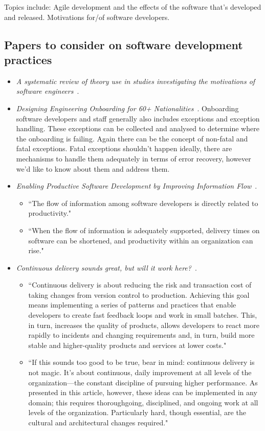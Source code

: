 Topics include: Agile development and the effects of the software that's developed and released. Motivations for/of software developers.

\subsection{Papers to consider on software development practices}
\begin{itemize}
    \item \emph{A systematic review of theory use in studies investigating the motivations of software engineers}~\citep{hall2009systematic}.
    \item \emph{Designing Engineering Onboarding for 60+ Nationalities}~\citep{harty2020_designing_engineering_onboarding}. Onboarding software developers and staff generally also includes exceptions and exception handling. These exceptions can be collected and analysed to determine where the onboarding is failing. Again there can be the concept of non-fatal and fatal exceptions. Fatal exceptions shouldn't happen ideally, there are mechanisms to handle them adequately in terms of error recovery, however we'd like to know about them and address them.
    \item \emph{Enabling Productive Software Development by Improving Information Flow}~\citep{murphy_enabling_2019}. 
    \begin{itemize}
        \item ``The flow of information among software developers is directly related to productivity."
        \item ``When the flow of information is adequately supported, delivery times on software can be shortened, and productivity within an organization can rise."
    \end{itemize}
    \item \emph{Continuous delivery sounds great, but will it work here?}~\citep{humble2018_continuous_delivery_sounds_great}. 
    \begin{itemize}
        \item ``Continuous delivery is about reducing the risk and transaction cost of taking changes from version control to production. Achieving this goal means implementing a series of patterns and practices that enable developers to create fast feedback loops and work in small batches. This, in turn, increases the quality of products, allows developers to react more rapidly to incidents and changing requirements and, in turn, build more stable and higher-quality products and services at lower costs."
        \item ``If this sounds too good to be true, bear in mind: continuous delivery is not magic. It's about continuous, daily improvement at all levels of the organization—the constant discipline of pursuing higher performance. As presented in this article, however, these ideas can be implemented in any domain; this requires thoroughgoing, disciplined, and ongoing work at all levels of the organization. Particularly hard, though essential, are the cultural and architectural changes required."
    \end{itemize}
    
\end{itemize}


